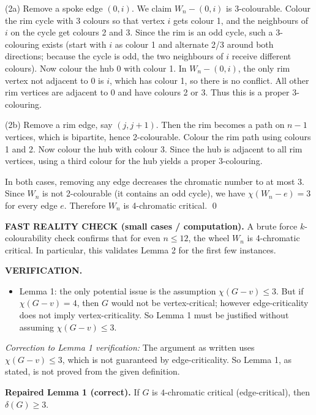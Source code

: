 (2a) Remove a spoke edge $(0,i)$.
We claim $W_n-(0,i)$ is 3-colourable.
Colour the rim cycle with 3 colours so that vertex $i$ gets colour 1, and the neighbours of $i$ on the cycle get colours 2 and 3.
Since the rim is an odd cycle, such a 3-colouring exists (start with $i$ as colour 1 and alternate 2/3 around both directions; because the cycle is odd, the two neighbours of $i$ receive different colours).
Now colour the hub $0$ with colour 1.
In $W_n-(0,i)$, the only rim vertex not adjacent to $0$ is $i$, which has colour 1, so there is no conflict.
All other rim vertices are adjacent to $0$ and have colours 2 or 3.
Thus this is a proper 3-colouring.

(2b) Remove a rim edge, say $(j,j+1)$.
Then the rim becomes a path on $n-1$ vertices, which is bipartite, hence 2-colourable.
Colour the rim path using colours 1 and 2.
Now colour the hub with colour 3.
Since the hub is adjacent to all rim vertices, using a third colour for the hub yields a proper 3-colouring.

In both cases, removing any edge decreases the chromatic number to at most 3.
Since $W_n$ is not 2-colourable (it contains an odd cycle), we have $\chi(W_n-e)=3$ for every edge $e$.
Therefore $W_n$ is 4-chromatic critical.
\qed

\medskip
\textbf{FAST REALITY CHECK (small cases / computation).}
A brute force $k$-colourability check confirms that for even $n\le 12$, the wheel $W_n$ is 4-chromatic critical.
In particular, this validates Lemma 2 for the first few instances.

\textbf{VERIFICATION.}
\begin{itemize}
\item Lemma 1: the only potential issue is the assumption $\chi(G-v)\le 3$. But if $\chi(G-v)=4$, then $G$ would not be vertex-critical; however edge-criticality does not imply vertex-criticality. So Lemma 1 must be justified without assuming $\chi(G-v)\le 3$.
\end{itemize}
\emph{Correction to Lemma 1 verification:} The argument as written uses $\chi(G-v)\le 3$, which is not guaranteed by edge-criticality.
So Lemma 1, as stated, is not proved from the given definition.

\medskip
\textbf{Repaired Lemma 1 (correct).} If $G$ is $4$-chromatic critical (edge-critical), then $\delta(G)\ge 3$.

